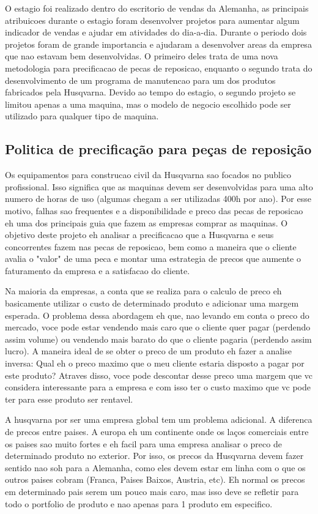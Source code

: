 \documentclass[12pt]{article}
\begin{document}
	O estagio foi realizado dentro do escritorio de vendas da Alemanha, as principais atribuicoes durante o estagio foram desenvolver projetos para aumentar algum indicador de vendas e ajudar em atividades do dia-a-dia.  Durante o periodo dois projetos foram de grande importancia e ajudaram a desenvolver areas da empresa que nao estavam bem desenvolvidas. O primeiro deles trata de uma nova metodologia para precificacao de pecas de reposicao, enquanto o segundo trata do desenvolvimento de um programa de manutencao para um dos produtos fabricados pela Husqvarna. Devido ao tempo do estagio, o segundo projeto se limitou apenas a uma maquina, mas o modelo de negocio escolhido pode ser utilizado para qualquer tipo de maquina.

\subsection{Politica de precificação para peças de reposição}

	Os equipamentos para construcao civil da Husqvarna sao focados no publico profissional. Isso significa que as maquinas devem ser desenvolvidas para uma alto numero de horas de uso (algumas chegam a ser utilizadas 400h por ano). Por esse motivo, falhas sao frequentes e a disponibilidade e preco das pecas de reposicao eh uma dos principais guia que fazem as empresas comprar as maquinas. O objetivo deste projeto eh analisar a precificacao que a Husqvarna e seus concorrentes fazem nas pecas de reposicao, bem como a maneira que o cliente avalia o "valor" de uma peca e montar uma estrategia de precos que aumente o faturamento da empresa e a satisfacao do cliente.

	Na maioria da empresas, a conta que se realiza para o calculo de preco eh basicamente utilizar o custo de determinado produto e adicionar uma margem esperada. O problema dessa abordagem eh que, nao levando em conta o preco do mercado, voce pode estar vendendo mais caro que o cliente quer pagar (perdendo assim volume) ou vendendo mais barato do que o cliente pagaria (perdendo assim lucro). A maneira ideal de se obter o preco de um produto eh fazer a analise inversa: Qual eh o preco maximo que o meu cliente estaria disposto a pagar por este produto? Atraves disso, voce pode descontar desse preco uma margem que vc considera interessante para a empresa e com isso ter o custo maximo que vc pode ter para esse produto ser rentavel.

	A husqvarna por ser uma empresa global tem um problema adicional. A diferenca de precos entre paises. A europa eh um continente onde os laços comerciais entre os paises sao muito fortes e eh facil para uma empresa analisar o preco de determinado produto no exterior. Por isso, os precos da Husqvarna devem fazer sentido nao soh para a Alemanha, como eles devem estar em linha com o que os outros paises cobram (Franca, Paises Baixos, Austria, etc). Eh normal os precos em determinado pais serem um pouco mais caro, mas isso deve se refletir para todo o portfolio de produto e nao apenas para 1 produto em especifico.
\end{document}
